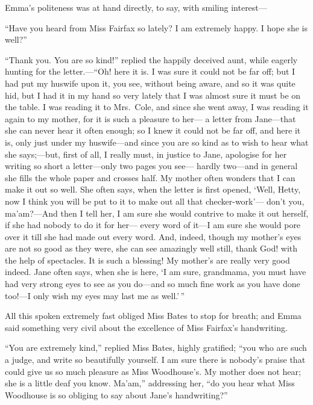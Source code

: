 Emma's politeness was at hand directly, to say, with smiling interest---%

``Have you heard from Miss Fairfax so lately?  I am extremely happy.
I hope she is well?''

``Thank you.  You are so kind!'' replied the happily deceived aunt,
while eagerly hunting for the letter.---``Oh! here it is.  I was sure
it could not be far off; but I had put my huswife upon it, you see,
without being aware, and so it was quite hid, but I had it in my hand
so very lately that I was almost sure it must be on the table.
I was reading it to Mrs.\ Cole, and since she went away, I was
reading it again to my mother, for it is such a pleasure to her---%
a letter from Jane---that she can never hear it often enough;
so I knew it could not be far off, and here it is, only just under
my huswife---and since you are so kind as to wish to hear what
she says;---but, first of all, I really must, in justice to Jane,
apologise for her writing so short a letter---only two pages you see---%
hardly two---and in general she fills the whole paper and crosses half.
My mother often wonders that I can make it out so well.
She often says, when the letter is first opened, `Well, Hetty,
now I think you will be put to it to make out all that checker-work'---%
don't you, ma'am?---And then I tell her, I am sure she would contrive
to make it out herself, if she had nobody to do it for her---%
every word of it---I am sure she would pore over it till she had
made out every word.  And, indeed, though my mother's eyes are not
so good as they were, she can see amazingly well still, thank God!
with the help of spectacles.  It is such a blessing!  My mother's
are really very good indeed.  Jane often says, when she is here,
`I am sure, grandmama, you must have had very strong eyes to see
as you do---and so much fine work as you have done too!---I only wish
my eyes may last me as well.'\,''

All this spoken extremely fast obliged Miss Bates to stop for breath;
and Emma said something very civil about the excellence of Miss
Fairfax's handwriting.

``You are extremely kind,'' replied Miss Bates, highly gratified;
``you who are such a judge, and write so beautifully yourself.
I am sure there is nobody's praise that could give us so much pleasure
as Miss Woodhouse's. My mother does not hear; she is a little deaf
you know.  Ma'am,'' addressing her, ``do you hear what Miss Woodhouse
is so obliging to say about Jane's handwriting?''

